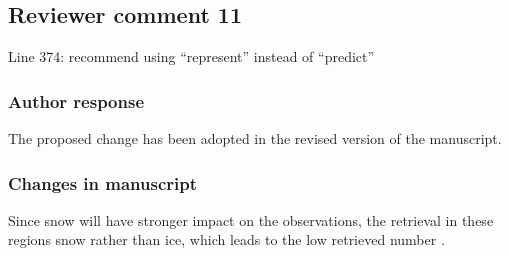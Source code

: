 %

\subsection*{Reviewer comment 11}
 Line 374: recommend using “represent” instead of “predict”

\subsubsection*{Author response}

The proposed change has been adopted in the revised version of the manuscript.

\subsubsection*{Changes in manuscript}

\begin{change}[365]
 Since snow will have \DIFdelbegin {}\DIFdelend \DIFaddbegin {}\DIFaddend stronger impact on the
observations, the retrieval in these regions \DIFdelbegin {}\DIFdelend \DIFaddbegin {}\DIFaddend snow
rather than ice, which leads to the low retrieved number \DIFdelbegin {}\DIFdelend \DIFaddbegin {}\DIFaddend .
\end{change}


